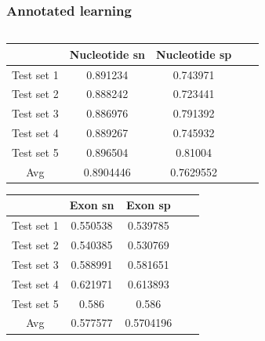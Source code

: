 \documentclass{beamer}[12pt]
\begin{document}
\begin{frame}
\frametitle{Annotated learning}
\begin{columns}

		\begin{scriptsize}
		\begin{table}[h!]
		
		\begin{tabular}{|c|c|c|c|c|}
		
			\hline
				&Nucleotide sn	& Nucleotide sp\\	
			\hline
				Test set 1	& 0.891234	& 0.743971\\
			\hline
				Test set 2	& 0.888242	& 0.723441\\
			\hline
				Test set 3	& 0.886976	& 0.791392\\
			\hline
				Test set 4	& 0.889267	& 0.745932\\
			\hline
				Test set 5	& 0.896504	& 0.81004\\
			\hline
				Avg		& 0.8904446	& 0.7629552\\
			\hline	
			
					
		\end{tabular}
	
		\vspace{0.5 cm}
		
		\begin{tabular}{|c|c|c|c|c|}
		
			\hline
				& Exon sn	& Exon sp\\
			\hline
				Test set 1 & 0.550538	& 0.539785\\
			\hline
				Test set 2	& 0.540385	& 0.530769	\\
			\hline
				Test set 3	& 0.588991	& 0.581651\\
			\hline
				Test set 4	& 0.621971	& 0.613893\\
			\hline
				Test set 5	& 0.586		& 0.586\\
			\hline
				Avg		& 0.577577	& 0.5704196\\
			\hline	
			
					
		\end{tabular}
		
		\end{table}
		
		\end{scriptsize}
		
		

\end{columns}
\end{frame}
\end{document}
